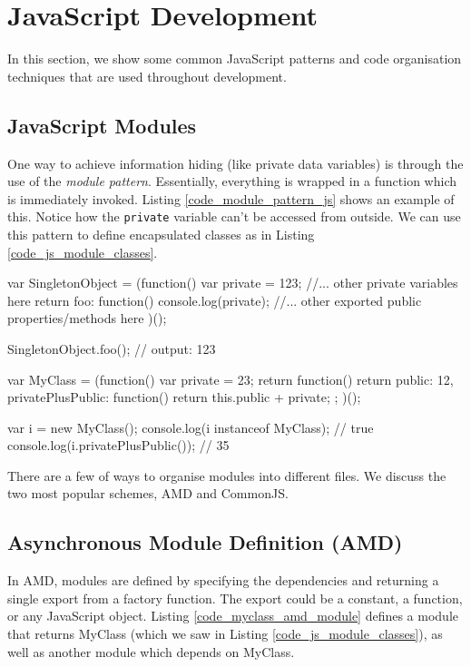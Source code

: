 \section{JavaScript Development} %
\label{sec:javascript_development}
In this section, we show some common JavaScript patterns and code organisation techniques that are used throughout development.

\subsection{JavaScript Modules} %
\label{sub:javascript_modules}
One way to achieve information hiding (like private data variables) is through the use of the \emph{module pattern}. Essentially, everything is wrapped in a function which is immediately invoked. Listing \ref{code_module_pattern_js} shows an example of this. Notice how the \lstinline{private} variable can't be accessed from outside. We can use this pattern to define encapsulated classes as in Listing \ref{code_js_module_classes}.

\begin{code}
var SingletonObject = (function(){
  var private = 123;
  //... other private variables here
  return {
    foo: function(){
      console.log(private);
    }
    //... other exported public properties/methods here
  }
})();

SingletonObject.foo(); // output: 123
\end{code}

\begin{code}
var MyClass = (function(){
  var private = 23;
  return function(){
    return {
      public: 12,
      privatePlusPublic: function(){
        return this.public + private;
      }
    }
  };
})();

var i = new MyClass();
console.log(i instanceof MyClass); // true
console.log(i.privatePlusPublic()); // 35
\end{code}


There are a few of ways to organise modules into different files. We discuss the two most popular schemes, AMD and CommonJS. 

\subsection{Asynchronous Module Definition (AMD)} %
\label{sub:asynchronous_module_definition_}
In AMD, modules are defined by specifying the dependencies and returning a single export from a factory function. The export could be a constant, a function, or any JavaScript object. Listing \ref{code_myclass_amd_module} defines a module that returns MyClass (which we saw in Listing \ref{code_js_module_classes}), as well as another module which depends on MyClass. 

